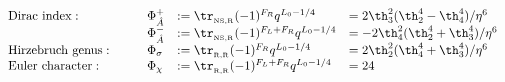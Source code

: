 \begin{equation}  \label{top-invar}
  \begin{array}{llll}
{\rm Dirac\  index:}\qquad &\Phi^+_{\hat A} &:= \tr_{_{\rm NS,R}}
  (-1)^{F_R} q^{L_0-1/4} &= 2 \th_3^2
  (\th_2^4 -\th_4^4) / \eta^6 \\
&\Phi^-_{\hat A}&:= \tr_{_{\rm NS,R}} (-1)^{F_L+F_R} q^{L_0-1/4}  &= -2 \th_4^2
  (\th_2^4+\th_3^4)  / \eta^6 \\
{\rm Hirzebruch\ genus:}\qquad &\Phi_\sigma &:= \tr_{_{\rm R,R}} (-1)^{F_R}
  q^{L_0-1/4} &= 2 \th_2^2
  (\th_4^4+\th_3^4) / \eta^6  \\
{\rm Euler\  character:}\qquad &\Phi_\chi &:= \tr_{_{\rm R,R}}
  (-1)^{F_L+F_R} q^{L_0-1/4} &= 24
  \end{array}
\end{equation}

